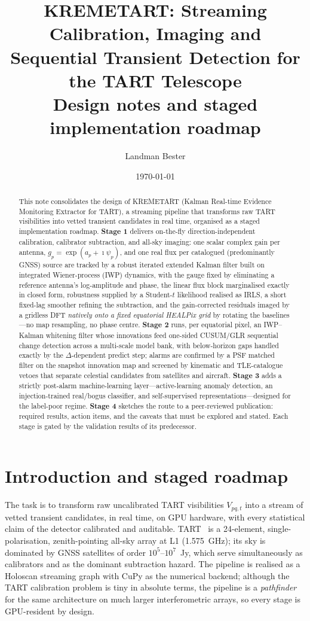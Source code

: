 \documentclass[11pt]{article}
\title{KREMETART: Streaming Calibration, Imaging and Sequential Transient Detection
for the TART Telescope\\ \large Design notes and staged implementation roadmap}
\author{Landman Bester}
\date{\today}
\begin{document}
\maketitle

\begin{abstract}
This note consolidates the design of KREMETART (Kalman Real-time Evidence Monitoring Extractor for
TART), a streaming pipeline that transforms raw TART visibilities into vetted transient candidates
in real time, organised as a staged implementation roadmap. \textbf{Stage 1} delivers on-the-fly
direction-independent calibration, calibrator subtraction, and all-sky imaging: one scalar complex
gain per antenna, $g_p=\exp(a_p+\imath\psi_p)$, and one real flux per catalogued (predominantly
GNSS) source are tracked by a robust iterated extended Kalman filter built on integrated
Wiener-process (IWP) dynamics, with the gauge fixed by eliminating a reference antenna's
log-amplitude and phase, the linear flux block marginalised exactly in closed form, robustness
supplied by a Student-$t$ likelihood realised as IRLS, a short fixed-lag smoother refining the
subtraction, and the gain-corrected residuals imaged by a gridless DFT \emph{natively onto a fixed
equatorial HEALPix grid} by rotating the baselines---no map resampling, no phase centre. \textbf{Stage 2}
runs, per equatorial pixel, an IWP--Kalman whitening filter whose innovations feed one-sided
CUSUM/GLR sequential change detection across a multi-scale model bank, with below-horizon gaps
handled exactly by the $\Delta$-dependent predict step; alarms are confirmed by a PSF matched
filter on the snapshot innovation map and screened by kinematic and TLE-catalogue vetoes that
separate celestial candidates from satellites and aircraft. \textbf{Stage 3} adds a strictly
post-alarm machine-learning layer---active-learning anomaly detection, an injection-trained
real/bogus classifier, and self-supervised representations---designed for the label-poor regime.
\textbf{Stage 4} sketches the route to a peer-reviewed publication: required results, action items,
and the caveats that must be explored and stated. Each stage is gated by the validation results of
its predecessor.
\end{abstract}

\section{Introduction and staged roadmap}
\label{sec:roadmap}

The task is to transform raw uncalibrated TART visibilities $V_{pq,t}$ into a stream of vetted
transient candidates, in real time, on GPU hardware, with every statistical claim of the detector
calibrated and auditable. TART~\cite{tart} is a 24-element, single-polarisation, zenith-pointing
all-sky array at L1 (1.575~GHz); its sky is dominated by GNSS satellites of order
$10^5$--$10^7$~Jy, which serve simultaneously as calibrators and as the dominant subtraction
hazard. The pipeline is realised as a Holoscan streaming graph with CuPy as the numerical backend;
although the TART calibration problem is tiny in absolute terms, the pipeline is a \emph{pathfinder}
for the same architecture on much larger interferometric arrays, so every stage is GPU-resident by
design.
\end{document}
